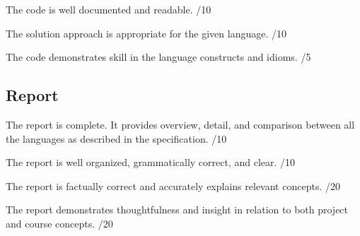 \documentclass[12pt,info]{asg}
\begin{document}
The code is well documented and readable. /10

The solution approach is appropriate for the given language. /10

The code demonstrates skill in the language constructs and idioms. /5

\subsection*{Report}
The report is complete. It provides overview, detail, and comparison between all the languages as described in the specification. /10

The report is well organized, grammatically correct, and clear. /10

The report is factually correct and accurately explains relevant concepts. /20

The report demonstrates thoughtfulness and insight in relation to both project and course concepts. /20




\end{document}
